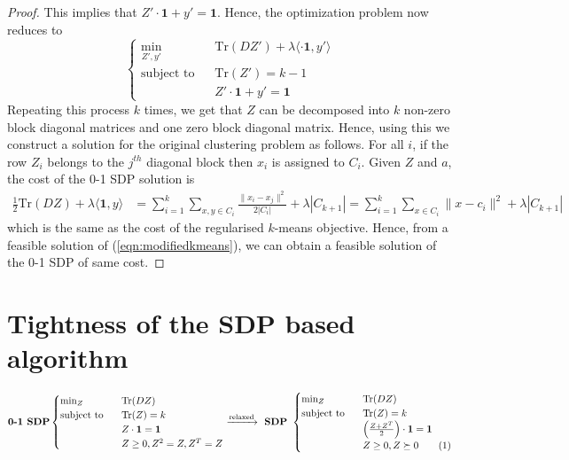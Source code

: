 \documentclass[12pt]{article}
\newcommand{\mb}{\mathbf}
\newcommand{\tr}{\text{Tr}}
\newcommand\numberthis{\addtocounter{equation}{1}\tag{\theequation}}
\begin{document}
\begin{proof}
This implies that $Z'\cdot \mb 1 + y' = \textbf{1}$. Hence, the optimization problem now reduces to
 \[
    \begin{cases}
		\min_{Z',y'} \enspace &\tr(DZ') + \lambda\langle \cdot \mb 1, y'\rangle\\
		\text{subject to } \enspace &\tr(Z') = k-1\\
		&Z'\cdot \mb 1 + y' = \mb 1
	\end{cases}
\]
Repeating this process $k$ times, we get that $Z$ can be decomposed into $k$ non-zero block diagonal matrices and one zero block diagonal matrix. Hence, using this we construct a solution for the original clustering problem as follows. For all $i$, if the row $Z_i$ belongs to the $j^{th}$ diagonal block then $x_i$ is assigned to $C_i$. Given $Z$ and $a$, the cost of the 0-1 SDP solution is
\begin{align*}
\frac{1}{2} \tr(DZ) + \lambda\langle\mb 1, y\rangle &= \sum_{i=1}^k\sum_{x,y \in C_i} \frac{\|x_i-x_j\|^2}{2|C_i|} + \lambda|C_{k+1}| = \sum_{i=1}^k \sum_{x \in C_i} \|x-c_i\|^2 + \lambda |C_{k+1}|
\end{align*}
which is the same as the cost of the regularised $k$-means objective. Hence, from a feasible solution of (\ref{eqn:modifiedkmeans}), we can obtain a feasible solution of the 0-1 SDP of same cost.
\end{proof}

\section{Tightness of the SDP based algorithm}

\begin{equation*}
	\textbf{0-1 SDP} 
	\begin{cases}
		\min_{Z} \enspace &\tr(DZ) \\
		\text{subject to } \enspace &\tr(Z) = k\\
		& Z\cdot \mb 1 = \mb 1\\	
		&Z\ge 0, Z^2 = Z, Z^T = Z 
	\end{cases}
	\xrightarrow{\text{relaxed}} \textbf{ SDP } 
	\begin{cases}
		\min_{Z} \enspace &\tr(DZ)\\
        \text{subject to } \enspace &\tr(Z) = k\\
		& \Big(\frac{Z+Z^T}{2}\Big)\cdot \mb 1 = \mb 1\\		
		&Z \ge 0, Z \succeq 0 \numberthis\label{a-eqn:SDP}
	\end{cases}
\end{equation*}
\end{document}
